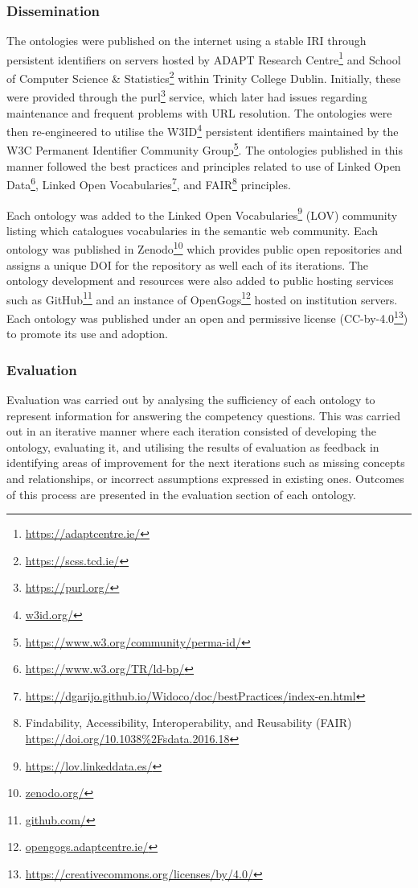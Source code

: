 \subsubsection*{Dissemination}
The ontologies were published on the internet using a stable IRI through persistent identifiers on servers hosted by ADAPT Research Centre\footnote{\url{https://adaptcentre.ie/}} and School of Computer Science \& Statistics\footnote{\url{https://scss.tcd.ie/}} within Trinity College Dublin. Initially, these were provided through the purl\footnote{\url{https://purl.org/}} service, which later had issues regarding maintenance and frequent problems with URL resolution. The ontologies were then re-engineered to utilise the W3ID\footnote{\url{w3id.org/}} persistent identifiers maintained by the W3C Permanent Identifier Community Group\footnote{\url{https://www.w3.org/community/perma-id/}}. The ontologies published in this manner followed the best practices and principles related to use of Linked Open Data\footnote{\url{https://www.w3.org/TR/ld-bp/}}, Linked Open Vocabularies\footnote{\url{https://dgarijo.github.io/Widoco/doc/bestPractices/index-en.html}}, and FAIR\footnote{Findability, Accessibility, Interoperability, and Reusability (FAIR) \url{https://doi.org/10.1038\%2Fsdata.2016.18}} principles.

Each ontology was added to the Linked Open Vocabularies\footnote{\url{https://lov.linkeddata.es/}} (LOV) community listing which catalogues vocabularies in the semantic web community. Each ontology was published in Zenodo\footnote{\url{zenodo.org/}} which provides public open repositories and assigns a unique DOI for the repository as well each of its iterations. The ontology development and resources were also added to public hosting services such as GitHub\footnote{\url{github.com/}} and an instance of OpenGogs\footnote{\url{opengogs.adaptcentre.ie/}} hosted on institution servers. Each ontology was published under an open and permissive license (CC-by-4.0\footnote{\url{https://creativecommons.org/licenses/by/4.0/}}) to promote its use and adoption.

\subsubsection*{Evaluation}
Evaluation was carried out by analysing the sufficiency of each ontology to represent information for answering the competency questions. This was carried out in an iterative manner where each iteration consisted of developing the ontology, evaluating it, and utilising the results of evaluation as feedback in identifying areas of improvement for the next iterations such as missing concepts and relationships, or incorrect assumptions expressed in existing ones. Outcomes of this process are presented in the evaluation section of each ontology.

